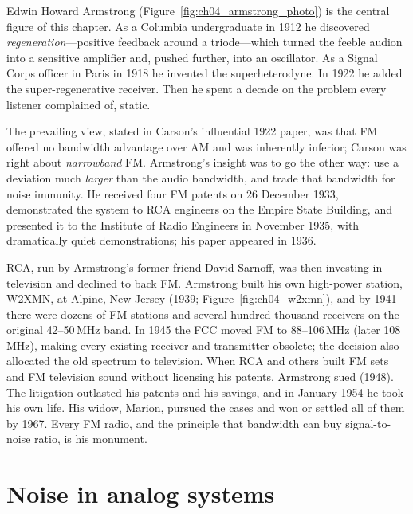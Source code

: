 \begin{history}
Edwin Howard Armstrong (Figure~\ref{fig:ch04_armstrong_photo}) is the central figure of this chapter. As a
Columbia undergraduate in 1912 he discovered \emph{regeneration}---positive feedback around a
triode---which turned the feeble audion into a sensitive amplifier and, pushed further, into an
oscillator. As a Signal Corps officer in Paris in 1918 he invented the superheterodyne. In 1922 he added the
super-regenerative receiver. Then he spent a decade on the problem every listener complained of, static.

The prevailing view, stated in Carson's influential 1922 paper, was that FM offered no bandwidth advantage
over AM and was inherently inferior; Carson was right about \emph{narrowband} FM. Armstrong's insight was to
go the other way: use a deviation much \emph{larger} than the audio bandwidth, and trade that bandwidth for
noise immunity. He received four FM patents on 26 December 1933, demonstrated the system to RCA engineers on
the Empire State Building, and presented it to the Institute of Radio Engineers in November 1935, with
dramatically quiet demonstrations; his paper appeared in 1936.

RCA, run by Armstrong's former friend David Sarnoff, was then investing in television and declined to back
FM. Armstrong built his own high-power station, W2XMN, at Alpine, New Jersey (1939;
Figure~\ref{fig:ch04_w2xmn}), and by 1941 there were dozens of FM stations and several hundred thousand
receivers on the original 42--50\,MHz band. In 1945 the FCC moved FM to 88--106\,MHz (later 108\,MHz),
making every existing receiver and transmitter obsolete; the decision also allocated the old spectrum to
television. When RCA and others built FM sets and FM television sound without licensing his patents,
Armstrong sued (1948). The litigation outlasted his patents and his savings, and in January 1954 he took his
own life. His widow, Marion, pursued the cases and won or settled all of them by 1967. Every FM radio, and
the principle that bandwidth can buy signal-to-noise ratio, is his monument.
\end{history}

\section{Noise in analog systems}
\label{sec:ch04:noise}

